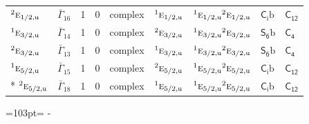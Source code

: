 \documentclass[10pt,a4paper]{article}
\newcommand{\needspace}[1]{\par\penalty-100\begingroup\dimen0=#1\relax\dimen2=\pagegoal
  \advance\dimen2-\pagetotal\ifdim\dimen0>\dimen2\relax\ifdim\dimen2>0pt\vfil\break\fi\fi
  \endgroup}
\numberwithin{equation}{section}
\newcommand{\grp}[1]{\mathsf{#1}}
\newcommand{\irr}[1]{\text{\normalfont\scshape #1}}
\newcommand{\conjpair}[1]{{}^{#1}}
\newcommand{\ptag}[1]{\mathrm{#1}}
\newcommand{\secondclass}{\mathrm{b}}
\begin{document}
{\begin{longtable}{@{}llrrlllll@{}}
$\conjpair{2}\irr{e}_{1/2,\ptag{u}}$ & $\bar{\Gamma}_{16}$ & 1 & $0$ & complex & $\conjpair{1}\irr{e}_{1/2,\ptag{u}}$ & $\conjpair{1}\irr{e}_{1/2,\ptag{u}}\conjpair{2}\irr{e}_{1/2,\ptag{u}}$ & \href{S2b.pdf}{$\grp{C_{i}}\secondclass$} & \href{../../../rotation/data/pdf/C12.pdf}{$\grp{C_{12}}$}\\
$\conjpair{1}\irr{e}_{3/2,\ptag{u}}$ & $\bar{\Gamma}_{14}$ & 1 & $0$ & complex & $\conjpair{2}\irr{e}_{3/2,\ptag{u}}$ & $\conjpair{1}\irr{e}_{3/2,\ptag{u}}\conjpair{2}\irr{e}_{3/2,\ptag{u}}$ & \href{S6b.pdf}{$\grp{S_{6}}\secondclass$} & \href{../../../rotation/data/pdf/C4.pdf}{$\grp{C_{4}}$}\\
$\conjpair{2}\irr{e}_{3/2,\ptag{u}}$ & $\bar{\Gamma}_{13}$ & 1 & $0$ & complex & $\conjpair{1}\irr{e}_{3/2,\ptag{u}}$ & $\conjpair{1}\irr{e}_{3/2,\ptag{u}}\conjpair{2}\irr{e}_{3/2,\ptag{u}}$ & \href{S6b.pdf}{$\grp{S_{6}}\secondclass$} & \href{../../../rotation/data/pdf/C4.pdf}{$\grp{C_{4}}$}\\
$\conjpair{1}\irr{e}_{5/2,\ptag{u}}$ & $\bar{\Gamma}_{15}$ & 1 & $0$ & complex & $\conjpair{2}\irr{e}_{5/2,\ptag{u}}$ & $\conjpair{1}\irr{e}_{5/2,\ptag{u}}\conjpair{2}\irr{e}_{5/2,\ptag{u}}$ & \href{S2b.pdf}{$\grp{C_{i}}\secondclass$} & \href{../../../rotation/data/pdf/C12.pdf}{$\grp{C_{12}}$}\\*
$\conjpair{2}\irr{e}_{5/2,\ptag{u}}$ & $\bar{\Gamma}_{18}$ & 1 & $0$ & complex & $\conjpair{1}\irr{e}_{5/2,\ptag{u}}$ & $\conjpair{1}\irr{e}_{5/2,\ptag{u}}\conjpair{2}\irr{e}_{5/2,\ptag{u}}$ & \href{S2b.pdf}{$\grp{C_{i}}\secondclass$} & \href{../../../rotation/data/pdf/C12.pdf}{$\grp{C_{12}}$}\\
\bottomrule\end{longtable}}
\needspace{103pt}
\end{document}
